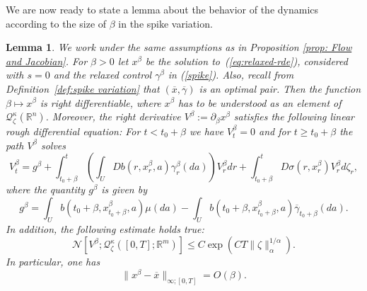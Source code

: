 \documentclass[12pt,reqno]{amsart}
\numberwithin{equation}{section}  %
\newcommand{\1}{{\bf 1}}
\newcommand{\2}{{\bf 2}}
\newcommand{\R}{\mathbb R}
\newcommand{\ga}{\gamma}
\newcommand{\ka}{\kappa}
\newcommand{\lp}{\left(}
\newcommand{\rp}{\right)}
\newtheorem{lemma}[theorem]{Lemma}
\theoremstyle{remark}
\theoremstyle{remark}
\begin{document}
We are now ready to state a lemma about the behavior of the dynamics according to the size of $\beta$ in the spike variation.
\begin{lemma} \label{Lemma: X}
We work under the same assumptions as in Proposition \ref{prop: Flow and Jacobian}. 
For $\beta>0$ let $x^{\beta}$ be the solution to~(\ref{eq:relaxed-rde}), considered with $s=0$ and the relaxed control $\gamma^{\beta}$ in (\ref{spike}). Also, recall from Definition~\ref{def:spike variation} that $(\overline{x},\overline{\gamma})$ is an optimal pair. Then the function $\beta\mapsto x^{\beta}$ is right differentiable, where $x^{\beta}$ has to be understood as an element of $\mathcal{Q}_{\zeta}^{\kappa}(\R^n)$. Moreover, the right derivative $V^{\beta}:= \partial_{\beta}x^{\beta}$ satisfies the following linear rough differential equation: For $t<t_{0}+\beta$ we have $V^{\beta}_{t}=0$ and for $t\geq t_{0}+\beta$ the path $V^{\beta}$ solves 
\begin{equation} \label{eq: RDE for derivative}
V^{\beta}_{t}=g^{\beta}+\int_{t_{0}+\beta}^{t}\lp\int_{U}Db(r,x_{r}^{\beta},a)\ga_{r}^{\beta}(da)\rp V_{r}^{\beta}dr +\int_{t_{0}+\beta}^{t}D\sigma(r,x_{r}^{\beta})V_{r}^{\beta}d\zeta_{r},
\end{equation}
where the quantity $g^{\beta}$ is given by
\begin{equation} \label{eq: g-beta}
g^{\beta}=\int_{U}b(t_{0}+\beta,x^{\beta}_{t_{0}+\beta},a)\mu(da)-\int_{U}b(t_{0}+\beta,x^{\beta}_{t_{0}+\beta},a)\overline{\ga}_{t_{0}+\beta}(da). 
\end{equation}
In addition, the following estimate holds true:
\begin{equation} \label{Ineq: derivative_of_dynamics}
\mathcal{N}\left[V^{\beta};\mathcal{Q}_{\zeta}^{\ka}([0,T];\R^m)\right]\leq C\exp\lp CT\|\zeta\|_{\alpha}^{1/\alpha} \rp .
\end{equation}
In particular, one has
\begin{equation}\|x^{\beta}-\overline{x}\|_{\infty;[0,T]}=O(\beta) .
\label{eq: Pontry-1}\end{equation}
        \end{lemma}
        
\end{document}
